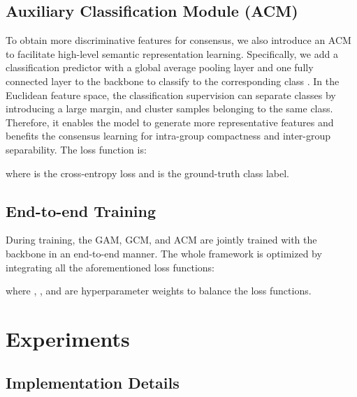 \documentclass[final]{cvpr}
\begin{document}
\subsection{Auxiliary Classification Module (ACM)}



To obtain more discriminative features for consensus, we also introduce an ACM to facilitate high-level semantic representation learning. Specifically, we add a classification predictor with a global average pooling layer and one fully connected layer to the backbone to classify  to the corresponding class . In the Euclidean feature space, the classification supervision can separate classes by introducing a large margin, and cluster samples belonging to the same class. Therefore, it enables the model to generate more representative features and benefits the consensus learning for intra-group compactness and inter-group separability. The loss function is:

where  is the cross-entropy loss and  is the ground-truth class label.



\subsection{End-to-end Training}

During training, the GAM, GCM, and ACM are jointly trained with the backbone in an end-to-end manner. The whole framework is optimized by integrating all the aforementioned loss functions:

where , , and  are hyperparameter weights to balance the loss functions.









\section{Experiments}
\subsection{Implementation Details}
\end{document}
